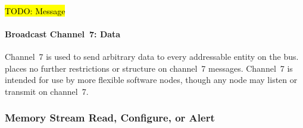 ~

\hl{TODO: Message}



\paragraph{Broadcast Channel~7: Data}
\label{scratch:scratch:sec:channel-7}
Channel~7 is used to send arbitrary data to every addressable entity on the
bus. \bus places no further restrictions or structure on channel~7 messages.
Channel~7 is intended for use by more flexible software nodes, though any node
may listen or transmit on channel~7.


\subsubsection{Memory Stream Read, Configure, or Alert}
\label{scratch:cmd:mem-stream-multi}

